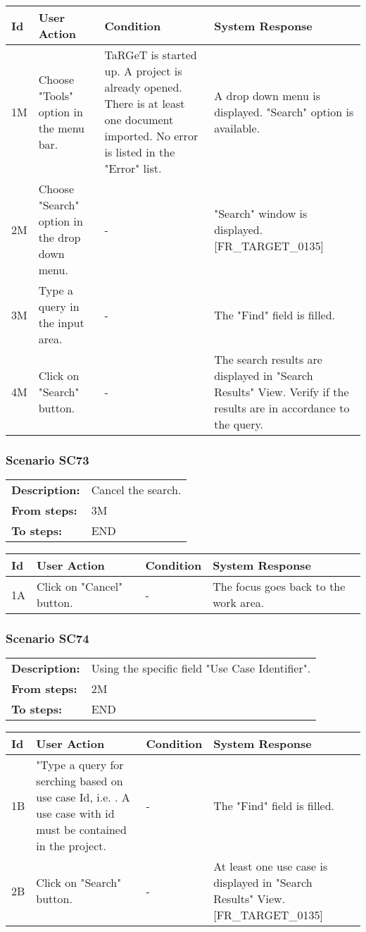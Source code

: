 \documentclass[a4paper,11pt]{article}
\newcommand{\bl}{\\ \hline}
\begin{document}
\begin{tabular}{|p{0.8in}|p{1.6in}|p{1.6in}|p{1.6in}|}
\hline
Id & User Action & Condition & System Response  \bl 
1M & Choose "Tools" option in the menu bar. & TaRGeT is started up. A project is already opened. There
						is at least one document imported. No error is listed in the
						"Error" list. & A drop down menu is displayed. "Search" option is
						available. \bl 
2M & Choose "Search" option in the drop down menu. & - & "Search" window is displayed. [FR_TARGET_0135] \bl 
3M & Type a query in the input area. & - & The "Find" field is filled. \bl 
4M & Click on "Search" button. & - & The search results are displayed in "Search Results"
						View. Verify if the results are in accordance to the query.
					 \bl 
\end{tabular}
\subsubsection*{Scenario SC73}
\begin{tabular}{p{1in}p{4in}}
{\bf Description:} & Cancel the search. \\
{\bf From steps:} & 3M \\
{\bf To steps:} & END \\
\end{tabular}
 
\begin{tabular}{|p{0.8in}|p{1.6in}|p{1.6in}|p{1.6in}|}
\hline
Id & User Action & Condition & System Response  \bl 
1A & Click on "Cancel" button.  & - & The focus goes back to the work area. \bl 
\end{tabular}
\subsubsection*{Scenario SC74}
\begin{tabular}{p{1in}p{4in}}
{\bf Description:} & Using the specific field "Use Case Identifier".
				 \\
{\bf From steps:} & 2M \\
{\bf To steps:} & END \\
\end{tabular}
 
\begin{tabular}{|p{0.8in}|p{1.6in}|p{1.6in}|p{1.6in}|}
\hline
Id & User Action & Condition & System Response  \bl 
1B & "Type a query for serching based on use case Id, i.e.
						. A
						use case with id
						must be contained in the project. & - & The "Find" field is filled. \bl 
2B & Click on "Search" button. & - & At least one use case is displayed in "Search Results"
						View. [FR_TARGET_0135] \bl 
\end{tabular}
\end{document}

